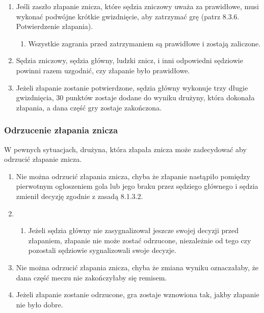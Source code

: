 \documentclass[12pt]{article}
\begin{document}
\begin{enumerate}
\item
  Jeśli zaszło złapanie znicza, które sędzia zniczowy uważa za
  prawidłowe, musi wykonać podwójne krótkie gwizdnięcie, aby zatrzymać
  grę (patrz 8.3.6. Potwierdzenie złapania).

  \begin{enumerate}
  \item
        Wszystkie zagrania przed zatrzymaniem są prawidłowe i zostają
    zaliczone.
      \end{enumerate}
\item
  Sędzia zniczowy, sędzia główny, ludzki znicz, i inni odpowiedni
  sędziowie powinni razem uzgodnić, czy złapanie było prawidłowe.
\item
    Jeżeli złapanie zostanie potwierdzone, sędzia główny wykonuje trzy
  długie gwizdnięcia, 30 punktów zostaje dodane do wyniku drużyny, która
  dokonała złapania, a dana część gry zostaje zakończona.
  \end{enumerate}

\subsubsection{Odrzucenie złapania znicza}

W pewnych sytuacjach, drużyna, która złapała znicza może zadecydować aby
odrzucić złapanie znicza.

\begin{enumerate}
\item
    Nie można odrzucić złapania znicza, chyba że złapanie nastąpiło
  pomiędzy pierwotnym ogłoszeniem gola lub jego braku przez sędziego
  głównego i sędzia zmienił decyzję zgodnie z zasadą 8.1.3.2.\item
  
  \begin{enumerate}
  \item
        Jeżeli sędzia główny nie zasygnalizował jeszcze swojej decyzji przed
    złapaniem, złapanie nie może zostać odrzucone, niezależnie od tego
    czy pozostali sędziowie sygnalizowali swoje decyzje.
      \end{enumerate}
\item
    Nie można odrzucić złapania znicza, chyba że zmiana wyniku
  oznaczałaby, że dana część meczu nie zakończyłaby się remisem.
  \item
    Jeżeli złapanie zostanie odrzucone, gra zostaje wznowiona tak, jakby
  złapanie nie było dobre.
  \end{enumerate}
\end{document}
